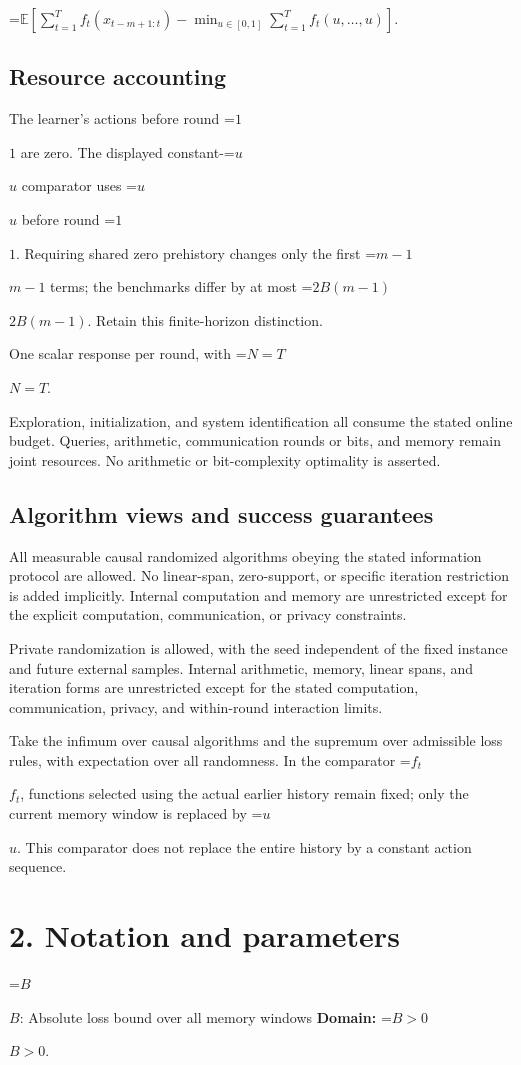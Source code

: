 \documentclass[10pt,a4paper]{article}
\newcommand{\AtlasMath}[1]{\par\begingroup\centering\setbox0=\hbox{$\displaystyle #1$}\ifdim\wd0>1.4\linewidth\typeout{ATLAS WIDE FORMULA: \the\wd0}\fi\ifdim\wd0>\linewidth\resizebox{\linewidth}{!}{\box0}\else\box0\fi\par\endgroup}
\newcommand{\AtlasInlineMath}[1]{\begingroup\setbox0=\hbox{$#1$}\ifdim\wd0>.4\linewidth\endgroup\AtlasMath{#1}\else\endgroup$#1$\fi}
\begin{document}
\AtlasMath{\mathbb{E}\!\left[\sum_{t=1}^{T}f_t(x_{t-m+1:t})-\min_{u\in[0,1]}\sum_{t=1}^{T}f_t(u,\ldots,u)\right].}


\subsection{Resource accounting}
The learner's actions before round \AtlasInlineMath{1} are zero. The displayed constant-\AtlasInlineMath{u} comparator uses \AtlasInlineMath{u} before round \AtlasInlineMath{1}. Requiring shared zero prehistory changes only the first \AtlasInlineMath{m-1} terms; the benchmarks differ by at most \AtlasInlineMath{2B(m-1)}. Retain this finite-horizon distinction.

One scalar response per round, with \AtlasInlineMath{N=T}.

Exploration, initialization, and system identification all consume the stated online budget. Queries, arithmetic, communication rounds or bits, and memory remain joint resources. No arithmetic or bit-complexity optimality is asserted.

\subsection{Algorithm views and success guarantees}
All measurable causal randomized algorithms obeying the stated information protocol are allowed. No linear-span, zero-support, or specific iteration restriction is added implicitly. Internal computation and memory are unrestricted except for the explicit computation, communication, or privacy constraints.

Private randomization is allowed, with the seed independent of the fixed instance and future external samples. Internal arithmetic, memory, linear spans, and iteration forms are unrestricted except for the stated computation, communication, privacy, and within-round interaction limits.

Take the infimum over causal algorithms and the supremum over admissible loss rules, with expectation over all randomness. In the comparator \AtlasInlineMath{f_t}, functions selected using the actual earlier history remain fixed; only the current memory window is replaced by \AtlasInlineMath{u}. This comparator does not replace the entire history by a constant action sequence.

\section{2. Notation and parameters}
\AtlasInlineMath{B}: Absolute loss bound over all memory windows \textbf{Domain:} \AtlasInlineMath{B>0}.
\end{document}
